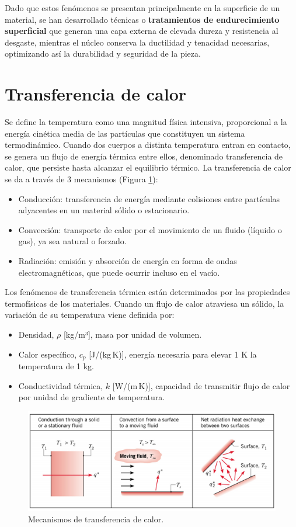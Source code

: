 Dado que estos fenómenos se presentan principalmente en la superficie de un material, se han desarrollado técnicas o \textbf{tratamientos de endurecimiento superficial} que generan una capa externa de elevada dureza y resistencia al desgaste, mientras el núcleo conserva la ductilidad y tenacidad necesarias, optimizando así la durabilidad y seguridad de la pieza.

\section{Transferencia de calor}

Se define la temperatura como una magnitud física intensiva, proporcional a la energía cinética media de las partículas que constituyen un sistema termodinámico. Cuando dos cuerpos a distinta temperatura entran en contacto, se genera un flujo de energía térmica entre ellos, denominado transferencia de calor, que persiste hasta alcanzar el equilibrio térmico. La transferencia de calor se da a través de 3 mecanismos (Figura \ref{calors}):

\begin{itemize}
  \item Conducción: transferencia de energía mediante colisiones entre partículas adyacentes en un material sólido o estacionario.
  \item Convección: transporte de calor por el movimiento de un fluido (líquido o gas), ya sea natural o forzado.
  \item Radiación: emisión y absorción de energía en forma de ondas electromagnéticas, que puede ocurrir incluso en el vacío.
\end{itemize}

Los fenómenos de transferencia térmica están determinados por las propiedades termofísicas de los materiales. Cuando un flujo de calor atraviesa un sólido, la variación de su temperatura viene definida por:

\begin{itemize}
  \item Densidad, \(\rho\) [kg/m³], masa por unidad de volumen.
  \item Calor específico, \(c_p\) [J/(kg\,K)], energía necesaria para elevar 1 K la temperatura de 1 kg.
  \item Conductividad térmica, \(k\) [W/(m\,K)], capacidad de transmitir flujo de calor por unidad de gradiente de temperatura.
\end{itemize}

\begin{figure}[h!]
    \centering
    \includegraphics[width=0.85\linewidth]{imgs/calor.png}
    \caption{Mecanismos de transferencia de calor.}
    \label{calors}
\end{figure}


